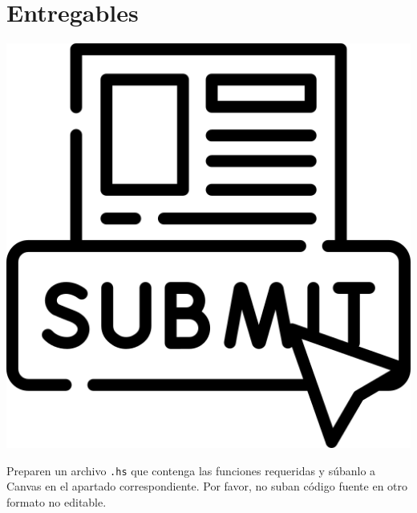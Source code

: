 \documentclass[]{article}
\theoremstyle{definition}
\begin{document}
\vspace{10ex}

\section*{Entregables}

\bigskip

\begin{minipage}{0.1\linewidth}
	\centering
	\includegraphics[scale = 0.06]{../img/submit}
\end{minipage}%
\begin{minipage}{0.85\linewidth}
	Preparen un archivo \texttt{.hs} que contenga las funciones requeridas y súbanlo a Canvas en el apartado correspondiente.
	Por favor, no suban código fuente en otro formato no editable.
\end{minipage}

\vfill
\end{document}
